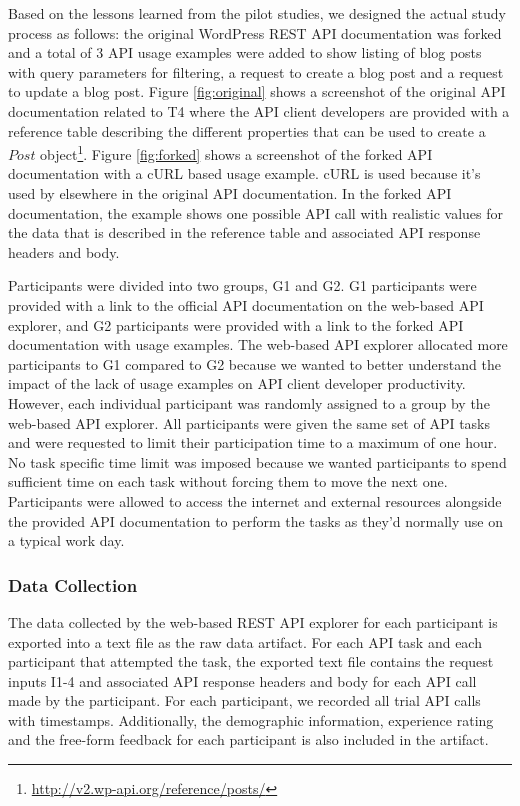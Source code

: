 \documentclass[conference]{IEEEtran}
\begin{document}
Based on the lessons learned from the pilot studies, we designed the actual study process as follows: the original WordPress REST API documentation was forked and a total of 3 API usage examples were added to show listing of blog posts with query parameters for filtering, a request to create a blog post and a request to update a blog post. Figure \ref{fig:original} shows a screenshot of the original API documentation related to T4 where the API client developers are provided with a reference table describing the different properties that can be used to create a $Post$ object\footnote{\url{http://v2.wp-api.org/reference/posts/}}. Figure \ref{fig:forked} shows a screenshot of the forked API documentation with a cURL based usage example. cURL is used because it's used by elsewhere in the original API documentation. In the forked API documentation, the example shows one possible API call with realistic values for the data that is described in the reference table and associated API response headers and body.

Participants were divided into two groups, G1 and G2. G1 participants were provided with a link to the official API documentation on the web-based API explorer, and G2 participants were provided with a link to the forked API documentation with usage examples. The web-based API explorer allocated more participants to G1 compared to G2 because we wanted to better understand the impact of the lack of usage examples on API client developer productivity. However, each individual participant was randomly assigned to a group by the web-based API explorer. All participants were given the same set of API tasks and were requested to limit their participation time to a maximum of one hour. No task specific time limit was imposed because we wanted participants to spend sufficient time on each task without forcing them to move the next one. Participants were allowed to access the internet and external resources alongside the provided API documentation to perform the tasks as they'd normally use on a typical work day.

\subsubsection{Data Collection} %
The data collected by the web-based REST API explorer for each participant is exported into a text file as the raw data artifact. For each API task and each participant that attempted the task, the exported text file contains the request inputs I1-4 and associated API response headers and body for each API call made by the participant. For each participant, we recorded all trial API calls with timestamps. Additionally, the demographic information, experience rating and the free-form feedback for each participant is also included in the artifact.
\end{document}
